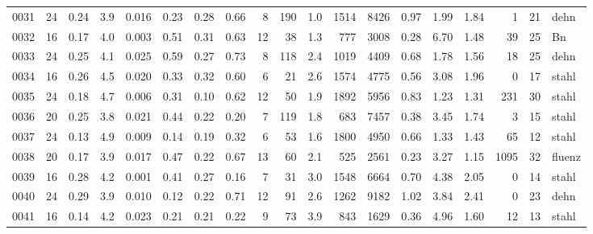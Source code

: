 {\begin{longtable}{@{}lrrrrrrrrrrrrrrrrrl@{}}
0031 & 24 & \num{0.24} & \num{3.9} & \num{0.016} & \num{0.23} & \num{0.28} & \num{0.66} & 8 & \num{190} & \num{1.0} & \num{1514} & \num{8426} & \num{0.97} & \num{1.99} & \num{1.84} & \num{1} & \num{21} & dehn \\
0032 & 16 & \num{0.17} & \num{4.0} & \num{0.003} & \num{0.51} & \num{0.31} & \num{0.63} & 12 & \num{38} & \num{1.3} & \num{777} & \num{3008} & \num{0.28} & \num{6.70} & \num{1.48} & \num{39} & \num{25} & Bn \\
0033 & 24 & \num{0.25} & \num{4.1} & \num{0.025} & \num{0.59} & \num{0.27} & \num{0.73} & 8 & \num{118} & \num{2.4} & \num{1019} & \num{4409} & \num{0.68} & \num{1.78} & \num{1.56} & \num{18} & \num{25} & dehn \\
0034 & 16 & \num{0.26} & \num{4.5} & \num{0.020} & \num{0.33} & \num{0.32} & \num{0.60} & 6 & \num{21} & \num{2.6} & \num{1574} & \num{4775} & \num{0.56} & \num{3.08} & \num{1.96} & \num{0} & \num{17} & stahl \\
0035 & 24 & \num{0.18} & \num{4.7} & \num{0.006} & \num{0.31} & \num{0.10} & \num{0.62} & 12 & \num{50} & \num{1.9} & \num{1892} & \num{5956} & \num{0.83} & \num{1.23} & \num{1.31} & \num{231} & \num{30} & stahl \\
0036 & 20 & \num{0.25} & \num{3.8} & \num{0.021} & \num{0.44} & \num{0.22} & \num{0.20} & 7 & \num{119} & \num{1.8} & \num{683} & \num{7457} & \num{0.38} & \num{3.45} & \num{1.74} & \num{3} & \num{15} & stahl \\
0037 & 24 & \num{0.13} & \num{4.9} & \num{0.009} & \num{0.14} & \num{0.19} & \num{0.32} & 6 & \num{53} & \num{1.6} & \num{1800} & \num{4950} & \num{0.66} & \num{1.33} & \num{1.43} & \num{65} & \num{12} & stahl \\
0038 & 20 & \num{0.17} & \num{3.9} & \num{0.017} & \num{0.47} & \num{0.22} & \num{0.67} & 13 & \num{60} & \num{2.1} & \num{525} & \num{2561} & \num{0.23} & \num{3.27} & \num{1.15} & \num{1095} & \num{32} & fluenz \\
0039 & 16 & \num{0.28} & \num{4.2} & \num{0.001} & \num{0.41} & \num{0.27} & \num{0.16} & 7 & \num{31} & \num{3.0} & \num{1548} & \num{6664} & \num{0.70} & \num{4.38} & \num{2.05} & \num{0} & \num{14} & stahl \\
0040 & 24 & \num{0.29} & \num{3.9} & \num{0.010} & \num{0.12} & \num{0.22} & \num{0.71} & 12 & \num{91} & \num{2.6} & \num{1262} & \num{9182} & \num{1.02} & \num{3.84} & \num{2.41} & \num{0} & \num{23} & dehn \\
0041 & 16 & \num{0.14} & \num{4.2} & \num{0.023} & \num{0.21} & \num{0.21} & \num{0.22} & 9 & \num{73} & \num{3.9} & \num{843} & \num{1629} & \num{0.36} & \num{4.96} & \num{1.60} & \num{12} & \num{13} & stahl \\

\end{longtable}}
